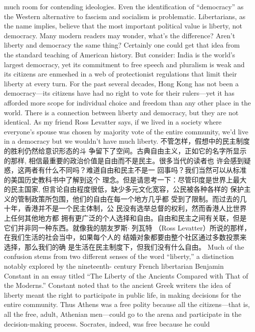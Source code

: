 \begin{paracol}{2}
much room for contending ideologies. Even the identification
of ``democracy'' as the Western alternative to fascism and socialism is problematic. Libertarians, as the name implies, believe
that the most important political value is liberty, not democracy. Many modern readers may wonder, what's the difference?
Aren't liberty and democracy the same thing? Certainly one
could get that idea from the standard teaching of American history. But consider: India is the world's largest democracy, yet its
commitment to free speech and pluralism is weak and its citizens are enmeshed in a web of protectionist regulations that
limit their liberty at every turn. For the past several decades,
Hong Kong has not been a democracy---its citizens have had
no right to vote for their rulers---yet it has afforded more scope
for individual choice and freedom than any other place in the
world. There is a connection between liberty and democracy,
but they are not identical. As my friend Ross Levatter says, if we
lived in a society where everyone's spouse was chosen by majority vote of the entire community, we'd live in a democracy but
we wouldn't have much liberty.
\switchcolumn
不管怎样，假想中的民主制度的胜利仍然给意识形态的斗
争留下了空间。古典自由主义，正如它的名字所显示的那样,
相信最重要的政治价值是自由而不是民主。很多当代的读者也
许会感到疑惑，这两者有什么不同吗？难道自由和民主不是一
回事吗？我们当然可以从标准的美国历史教科书中了解到这个
理念。但是请思考一下：尽管印度是世界上最大的民主国家,
但言论自由程度很低，缺少多元文化宽容，公民被各种各样的
保护主义的管制政策所包围，他们的自由在每一个地方几乎都
受到了限制。而过去的几十年，香港并不是一个民主体制，公
民没有选举总督的权利，然而香港人比世界上任何其他地方都
拥有更广泛的个人选择和自由。自由和民主之间有关联，但是
它们并非同一种东西。就像我的朋友罗斯$\cdot$ 列瓦特 （Ross  Levatter）所说的那样，在我们生活的社会当中，如果每个人的
结婚对象都要由整个社区通过多数投票来选择，那么我们的确
是生活在民主制度下，但我们没有什么自由。
\switchcolumn*
Much of the confusion stems from two different senses of the
word ``liberty,'' a distinction notably explored by the nineteenth-
century French libertarian Benjamin Constant in an essay titled
``The Liberty of the Ancients Compared with That of the Moderns.'' Constant noted that to the ancient Greek writers the idea
of liberty meant the right to participate in public life, in making
decisions for the entire community. Thus Athens was a free polity because all the citizens---that is, all the free, adult, Athenian men---could go to the arena and participate in the decision-making process. Socrates, indeed, was free because he could

\end{paracol}
